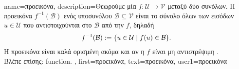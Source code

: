 {name={\foreignlanguage{greek}{προεικόνα}}, 
	description={\foreignlanguage{greek}{Θεωρούμε μία}  $f\colon \mathcal{U} \rightarrow \mathcal{V}$ 
		\foreignlanguage{greek}{μεταξύ δύο συνόλων. Η προεικόνα $f^{-1}(\mathcal{B})$ ενός υποσυνόλου $\mathcal{B} \subseteq \mathcal{V}$ 
		είναι το σύνολο όλων των εισόδων $u \in \mathcal{U}$ που αντιστοιχούνται στο $\mathcal{B}$ από την $f$, δηλαδή}
		\[
		f^{-1}(\mathcal{B}) := \{ u \in \mathcal{U} \mid f(u) \in \mathcal{B} \}.
		\]
		\foreignlanguage{greek}{Η προεικόνα είναι καλά ορισμένη ακόμα και αν η}  $f$ \foreignlanguage{greek}{είναι 
		μη αντιστρέψιμη} \cite{RudinBookPrinciplesMatheAnalysis}. \\
		\foreignlanguage{greek}{Βλέπε επίσης:} \gls{function}. },
	first={\foreignlanguage{greek}{προεικόνα}},
	text={\foreignlanguage{greek}{προεικόνα}},
	user1={\foreignlanguage{greek}{προεικόνα}} %
}

